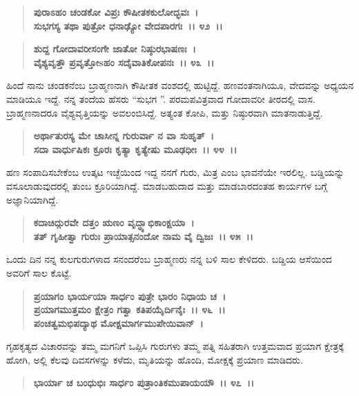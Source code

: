 \begin{verse}
\textbf{ಪುರಾಽಹಂ ಚಂಡಕೋ ವಿಪ್ರಃ ಕೌಷೀತಕಕುಲೋದ್ಭವಃ~।}\\\textbf{ಸುಭಗಸ್ಯ ತಥಾ ಪುತ್ರೋ ಧನಾಢ್ಯೋ ವೇದಪಾರಗಃ~।। ೪೨~।। }
\end{verse}

\begin{verse}
\textbf{ಶುದ್ದ ಗೋದಾವರೀಸಂಗೇ ಜಾತೋ ನಿಷ್ಠುರಭಾಷಣಃ~।}\\\textbf{ವೈಶ್ಯವೃತ್ತೌ ಪ್ರವೃತ್ತೋsಹಂ ಸದೈವಾತಿಕೋಪನಃ~।। ೪೩~।।}
\end{verse}

ಹಿಂದೆ ನಾನು ಚಂಡಕನೆಂಬ ಬ್ರಾಹ್ಮಣನಾಗಿ ಕೌಷೀತಕ ವಂಶದಲ್ಲಿ ಹುಟ್ಟಿದ್ದೆ. ಹಣವಂತನಾಗಿಯೂ, ವೇದವನ್ನು ಅಧ್ಯಯನ ಮಾಡಿಯೂ ಇದ್ದೆ. ನನ್ನ ತಂದೆಯ ಹೆಸರು “ಸುಭಗ ”. ಪರಮಪವಿತ್ರವಾದ ಗೋದಾವರೀ ತೀರದಲ್ಲಿ ವಾಸ. ಬ್ರಾಹ್ಮಣನಾದರೂ ವೈಶ್ಯವೃತ್ತಿಯನ್ನು ಅವಲಂಬಿಸಿದ್ದೆ. ಅತ್ಯಂತ ಕೋಪಿ, ಮತ್ತು ನಿಷ್ಠುರವಾಗಿ ಮಾತನಾಡುತ್ತಿದ್ದೆ.

\begin{verse}
\textbf{ಅರ್ಥಾತುರಸ್ಯ ಮೇ ಚಾಸೀನ್ನ ಗುರುರ್ವಾ ನ ವಾ ಸುಹೃತ್~।}\\\textbf{ಸದಾ ವಾರ್ಧುಷಿಕಃ ಕ್ರೂರಃ ಕೃತ್ಯಾ ಕೃತ್ಯೇಷು ಮೂಢಧೀಃ~।। ೪೪~।।}
\end{verse}

ಹಣ ಸಂಪಾದಿಸಬೇಕೆಂಬ ಉತ್ಕಟ ಇಚ್ಛೆಯಿಂದ ಇದ್ದ ನನಗೆ ಗುರು, ಮಿತ್ರ ಎಂಬ ಭಾವನೆಯೇ ಇರಲಿಲ್ಲ. ಬಡ್ಡಿಯನ್ನು ವಸೂಲಾಡುವುದರಲ್ಲಿ ತುಂಬ ಕ್ರೂರಿಯಾಗಿದ್ದೆ. ಮಾಡಬಹುದಾದ ಮತ್ತು ಮಾಡಬಾರದಂತಹ ಕಾರ್ಯಗಳ ಬಗ್ಗೆ ಅಜ್ಞಾನಿಯಾಗಿದ್ದೆ.

\begin{verse}
\textbf{ಕದಾಚಿದ್ಗುರವೇ ದತ್ತಂ ಋಣಂ ವೃದ್ಧ್ಯಾಭಿಕಾಂಕ್ಷಯಾ~।}\\\textbf{ತತ್ ಗೃಹೀತ್ವಾ ಗುರುಃ ಪ್ರಾಯಾತ್ಸನಂದೋ ನಾಮ ವೈ ದ್ವಿಜಃ~।। ೪೫~।।}
\end{verse}

ಒಂದು ದಿನ ನನ್ನ ಕುಲಗುರುಗಳಾದ ಸನಂದರೆಂಬ ಬ್ರಾಹ್ಮಣರು ನನ್ನ ಬಳಿ ಸಾಲ ಕೇಳಿದರು. ಬಡ್ಡಿಯ ಆಸೆಯಿಂದ ಅವರಿಗೆ ಸಾಲ ಕೊಟ್ಟೆ.

\begin{verse}
\textbf{ಪ್ರಯಾಗಂ ಭಾರ್ಯಯಾ ಸಾರ್ಧಂ ಪುತ್ರೇ ಭಾರಂ ನಿಧಾಯ ಚ~।}\\\textbf{ಪ್ರಯಾಗಮುತ್ತಮಂ ಕ್ಷೇತ್ರಂ ಗತ್ವಾ ಕತಿಪಯೈರ್ದಿನೈಃ~।। ೪೬~।। }\\\textbf{ಪಂಚತ್ವಮಭಿಪದ್ಯಾಥ ಮೋಕ್ಷಮಾರ್ಗಮುಪೇಯಿವಾನ್~।}
\end{verse}

ಗೃಹಕೃತ್ಯದ ವಿಚಾರವನ್ನು ತಮ್ಮ ಮಗನಿಗೆ ಒಪ್ಪಿಸಿ ಗುರುಗಳು ತಮ್ಮ ಪತ್ನಿ ಸಹಿತರಾಗಿ ಉತ್ತಮವಾದ ಪ್ರಯಾಗ ಕ್ಷೇತ್ರಕ್ಕೆ ಹೋಗಿ, ಅಲ್ಲಿ ಕೆಲವು ದಿವಸಗಳನ್ನು ಕಳೆದು, ಮೃತಿಯನ್ನು ಹೊಂದಿ, ಮೋಕ್ಷಕ್ಕೆ ಪ್ರಯಾಣ ಮಾಡಿದರು.

\begin{verse}
\textbf{ಭಾರ್ಯಾ ಚ ಬಂಧುಭಿಃ ಸಾರ್ಧಂ ಪುತ್ರಾಂತಿಕಮುಪಾಯಯೌ~।। ೪೭~।।}
\end{verse}

